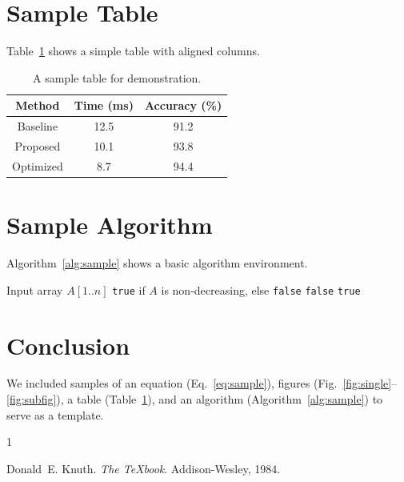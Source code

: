 \documentclass{tmsce}
\begin{document}
\section{Sample Table}
Table~\ref{tab:example} shows a simple table with aligned columns.

\begin{table}[!t]
\centering
\caption{A sample table for demonstration.}
\label{tab:example}
\renewcommand{\arraystretch}{1.2}
\begin{tabular}{|c|c|c|}
\hline
\textbf{Method} & \textbf{Time (ms)} & \textbf{Accuracy (\%)} \\
\hline
Baseline & 12.5 & 91.2 \\
Proposed & 10.1 & 93.8 \\
Optimized & 8.7 & 94.4 \\
\hline
\end{tabular}
\end{table}

\section{Sample Algorithm}
Algorithm~\ref{alg:sample} shows a basic algorithm environment.

\begin{algorithm}[!t]
\caption{Sample procedure (toy example).}
\label{alg:sample}
\begin{algorithmic}[1]
\REQUIRE Input array $A[1..n]$
\ENSURE \texttt{true} if $A$ is non-decreasing, else \texttt{false}
    \RETURN \texttt{false}
  \ENDIF
\ENDFOR
\RETURN \texttt{true}
\end{algorithmic}
\end{algorithm}

\section{Conclusion}
We included samples of an equation (Eq.~\ref{eq:sample}), figures (Fig.~\ref{fig:single}--\ref{fig:subfig}),
a table (Table~\ref{tab:example}), and an algorithm (Algorithm~\ref{alg:sample}) to serve as a template.


\begin{thebibliography}{1}

Donald~E. Knuth.
\newblock \emph{The \TeX book}.
\newblock Addison-Wesley, 1984.

\end{thebibliography}
\end{document}
